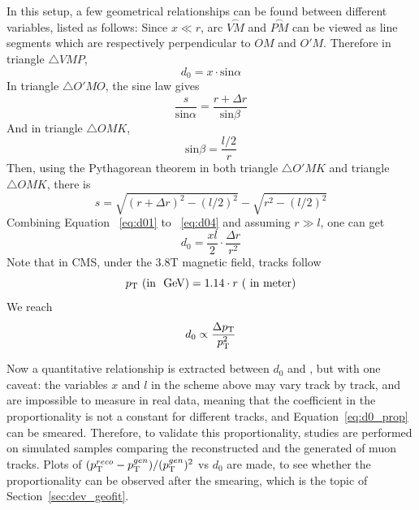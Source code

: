 In this setup, a few geometrical relationships can be found between different variables, listed as follows:
Since $x \ll r$, arc $\stackrel{\frown}{VM}$ and $\stackrel{\frown}{PM}$ can be viewed as line segments which are respectively perpendicular to $OM$ and $O'M$.
Therefore in triangle $\triangle VMP$, 
\begin{equation}\label{eq:d01}
      d_0 = x \cdot \text{sin}\alpha
\end{equation}      
In triangle $\triangle O'MO$, the sine law gives
\begin{equation}\label{eq:d02}
      \frac{s}{\text{sin}\alpha} = \frac{r+\Delta{}r}{\text{sin}\beta}
\end{equation}
And in triangle $\triangle OMK$, 
\begin{equation}\label{eq:d03}
      \text{sin}\beta = \frac{l/2}{r}
\end{equation}   
Then, using the Pythagorean theorem in both triangle $\triangle O'MK$ and triangle $\triangle OMK$, there is
\begin{equation}\label{eq:d04}
      s =  \sqrt{(r+\Delta{}r)^{2} - (l/2)^{2}} - \sqrt{r^{2} - (l/2)^{2}}
\end{equation}   
Combining Equation ~\ref{eq:d01} to ~\ref{eq:d04} and assuming $r \gg l$, one can get
\begin{equation}\label{eq:d05}
      d_0 = \frac{xl}{2} \cdot \frac{\Delta{}r}{r^{2}}
\end{equation}  
Note that in CMS, under the 3.8T magnetic field, tracks follow 
\begin{equation}
    p_{\mathrm{T}} ~(\text{in ~\ensuremath{\mbox{GeV}}}) = 1.14 \cdot r ~(~\text{in meter})   
\end{equation}
We reach
\begin{equation}\label{eq:d0_prop}
    d_0 \propto \frac{\Delta{}p_{\mathrm{T}}}{p_{\mathrm{T}}^{2}}
\end{equation}

Now a quantitative relationship is extracted between $d_0$ and \pt, but with one caveat:
the variables $x$ and $l$ in the scheme above may vary track by track, and are impossible to measure in real data,
meaning that the coefficient in the proportionality is not a constant for different tracks, and Equation~\ref{eq:d0_prop} can be smeared.
Therefore, to validate this proportionality, studies are performed on simulated samples comparing the reconstructed \pt and the generated \pt of muon tracks.
Plots of $(p_{\mathrm{T}}^{reco}-p_{\mathrm{T}}^{gen})/ (p_{\mathrm{T}}^{gen})^{2}$ vs $d_0$ are made, 
to see whether the proportionality can be observed after the smearing,
which is the topic of Section~\ref{sec:dev_geofit}.

